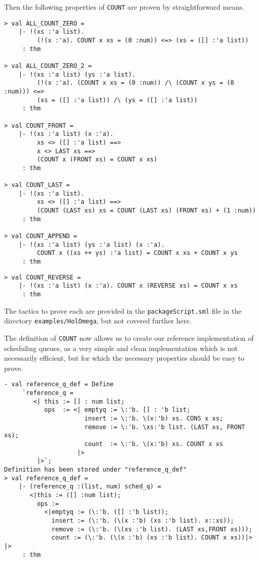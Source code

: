 Then the following properties of {\tt COUNT} are proven by straightforward means.
\begin{session}
\begin{verbatim}
> val ALL_COUNT_ZERO =
    |- !(xs :'a list).
         (!(x :'a). COUNT x xs = (0 :num)) <=> (xs = ([] :'a list))
     : thm

> val ALL_COUNT_ZERO_2 =
    |- !(xs :'a list) (ys :'a list).
         (!(x :'a). (COUNT x xs = (0 :num)) /\ (COUNT x ys = (0 :num))) <=>
         (xs = ([] :'a list)) /\ (ys = ([] :'a list))
     : thm

> val COUNT_FRONT =
    |- !(xs :'a list) (x :'a).
         xs <> ([] :'a list) ==>
         x <> LAST xs ==>
         (COUNT x (FRONT xs) = COUNT x xs)
     : thm

> val COUNT_LAST =
    |- !(xs :'a list).
         xs <> ([] :'a list) ==>
         (COUNT (LAST xs) xs = COUNT (LAST xs) (FRONT xs) + (1 :num))
     : thm
     
> val COUNT_APPEND =
    |- !(xs :'a list) (ys :'a list) (x :'a).
         COUNT x ((xs ++ ys) :'a list) = COUNT x xs + COUNT x ys
     : thm
\end{verbatim}
\end{session}

\begin{session}
\begin{verbatim}
> val COUNT_REVERSE =
    |- !(xs :'a list) (x :'a). COUNT x (REVERSE xs) = COUNT x xs
     : thm
\end{verbatim}
\end{session}
The tactics to prove each are provided in the {\tt packageScript.sml} file in
the directory {\tt examples/HolOmega}, but not covered further here.

The definition of {\tt COUNT} now allows us to create our reference
implementation of scheduling queues, as a very simple and clean implementation
which is not necessarily efficient, but for which the necessary properties 
should be easy to prove.
\begin{session}
\begin{verbatim}
- val reference_q_def = Define
     `reference_q =
        <| this := [] : num list;
           ops  := <| emptyq := \:'b. [] : 'b list;
                      insert := \:'b. \(x:'b) xs. CONS x xs;
                      remove := \:'b. \xs:'b list. (LAST xs, FRONT xs);
                      count  := \:'b. \(x:'b) xs. COUNT x xs
                    |>
         |>`;
Definition has been stored under "reference_q_def"
> val reference_q_def =
    |- (reference_q :(list, num) sched_q) =
       <|this := ([] :num list);
         ops :=
           <|emptyq := (\:'b. ([] :'b list));
             insert := (\:'b. (\(x :'b) (xs :'b list). x::xs));
             remove := (\:'b. (\(xs :'b list). (LAST xs,FRONT xs)));
             count := (\:'b. (\(x :'b) (xs :'b list). COUNT x xs))|> |>
     : thm
\end{verbatim}
\end{session}

